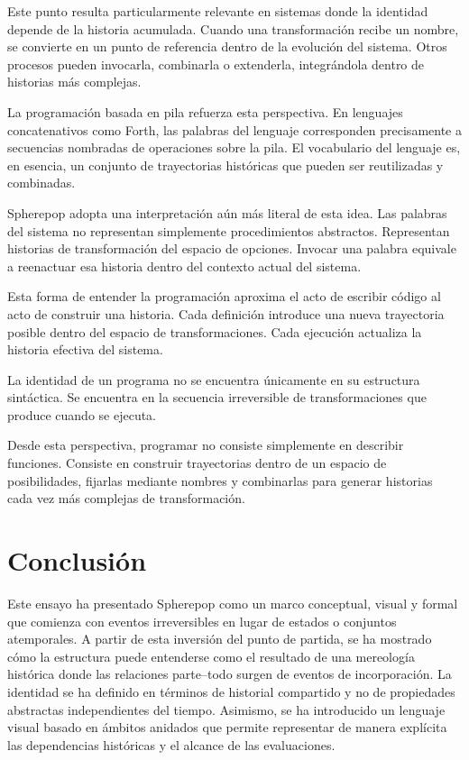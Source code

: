 \documentclass[12pt]{article}
\begin{document}
Este punto resulta particularmente relevante en sistemas donde la identidad depende de la historia acumulada. Cuando una transformación recibe un nombre, se convierte en un punto de referencia dentro de la evolución del sistema. Otros procesos pueden invocarla, combinarla o extenderla, integrándola dentro de historias más complejas.

La programación basada en pila refuerza esta perspectiva. En lenguajes concatenativos como Forth, las palabras del lenguaje corresponden precisamente a secuencias nombradas de operaciones sobre la pila. El vocabulario del lenguaje es, en esencia, un conjunto de trayectorias históricas que pueden ser reutilizadas y combinadas.

Spherepop adopta una interpretación aún más literal de esta idea. Las palabras del sistema no representan simplemente procedimientos abstractos. Representan historias de transformación del espacio de opciones. Invocar una palabra equivale a reenactuar esa historia dentro del contexto actual del sistema.

Esta forma de entender la programación aproxima el acto de escribir código al acto de construir una historia. Cada definición introduce una nueva trayectoria posible dentro del espacio de transformaciones. Cada ejecución actualiza la historia efectiva del sistema.

La identidad de un programa no se encuentra únicamente en su estructura sintáctica. Se encuentra en la secuencia irreversible de transformaciones que produce cuando se ejecuta.

Desde esta perspectiva, programar no consiste simplemente en describir funciones. Consiste en construir trayectorias dentro de un espacio de posibilidades, fijarlas mediante nombres y combinarlas para generar historias cada vez más complejas de transformación.


\section{Conclusión}

Este ensayo ha presentado Spherepop como un marco conceptual, visual y formal que comienza con eventos irreversibles en lugar de estados o conjuntos atemporales. A partir de esta inversión del punto de partida, se ha mostrado cómo la estructura puede entenderse como el resultado de una mereología histórica donde las relaciones parte--todo surgen de eventos de incorporación. La identidad se ha definido en términos de historial compartido y no de propiedades abstractas independientes del tiempo. Asimismo, se ha introducido un lenguaje visual basado en ámbitos anidados que permite representar de manera explícita las dependencias históricas y el alcance de las evaluaciones.
\end{document}
